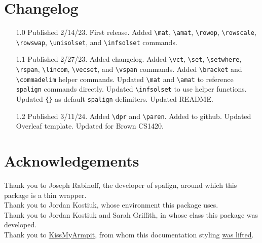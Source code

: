 \documentclass{article}
\begin{document}
\section{Changelog}
\begin{itemize}
    \item[1.0] Published 2/14/23. First release. Added \verb|\mat|, \verb|\amat|, \verb|\rowop|, \verb|\rowscale|, \verb|\rowswap|, \verb|\unisolset|, and \verb|\infsolset| commands.
    \item[1.1] Published 2/27/23. Added changelog. Added \verb|\vct|, \verb|\set|, \verb|\setwhere|, \verb|\rspan|, \verb|\lincom|, \verb|\vecset|, and \verb|\vspan| commands. Added \verb|\bracket| and \verb|\commadelim| helper commands. Updated \verb|\mat| and \verb|\amat| to reference \verb|spalign| commands directly. Updated \verb|\infsolset| to use helper functions. Updated \verb|{}| as default \verb|spalign| delimiters. Updated README.
    \item[1.2] Published 3/11/24. Added \verb|\dpr| and \verb|\paren|. Added to github. Updated Overleaf template. Updated for Brown CS1420.
\end{itemize}

\section{Acknowledgements}
Thank you to Joseph Rabinoff, the developer of spalign, around which this package is a thin wrapper.\\
Thank you to Jordan Kostiuk, whose environment this package uses.\\
Thank you to Jordan Kostiuk and Sarah Griffith, in whose class this package was developed.\\
Thank you to \href{https://tex.stackexchange.com/users/19356/kiss-my-armpit}{KissMyArmpit}, from whom this documentation styling \href{https://tex.stackexchange.com/questions/155770/printing-latex-command-without-compiling-it}{was lifted}.\\
\end{document}
